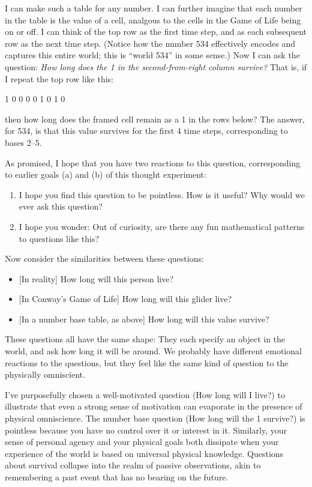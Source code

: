 \documentclass[9pt, twoside]{book}
\theoremstyle{argtstyle}
\begin{document}
I can make such a table for any number.
I can further imagine that each number in the table is the value of a cell,
analgous to the cells in the Game of Life being on or off.
I can think of the
top row as the first time step, and as each subsequent row as the next time
step.
(Notice how the number 534 effectively encodes and captures this entire
world; this is ``world 534'' in some sense.)
Now I can ask the question:
{\em How long does the 1 in the second-from-right column survive?}
That is, if I repeat the top row like this:
\begin{center}
    1 0 0 0 0 1 0 1  0
\end{center}
then how long does the framed cell
remain as a 1 in the rows below?
The answer, for 534, is that this value survives for the first 4
time steps, corresponding to bases 2--5.

As promised, I hope that you have two reactions to this question, corresponding
to earlier goals (a) and (b) of this thought experiment:
\begin{enumerate}
    \item I hope you find this question to be pointless. How is it useful?
        Why would we ever ask this question?
    \item I hope you wonder:
        Out of curiosity, are there any fun mathematical patterns to questions
        like this?
\end{enumerate}

Now consider the similarities between these questions:
\begin{itemize}
    \item{} [In reality] How long will this person live?
    \item{} [In Conway's Game of Life] How long will this glider live?
    \item{} [In a number base table, as above] How long will this value survive?
\end{itemize}
These questions all have the same shape: They each specify an
object in the world, and ask how long it will be around.
We probably have different emotional reactions to the questions, but they feel
like the same kind of question to the physically omniscient.

I've
purposefully chosen a well-motivated question (How long will I
live?) to illustrate that even a strong sense of motivation can evaporate
in the presence of physical omniscience.
The number base question (How long will the 1 survive?) is
pointless because you have no control over it or interest in it.
Similarly, your sense of personal agency
and your physical goals both dissipate when your experience of the world is
based
on universal physical knowledge. Questions about survival collapse into the
realm of passive observations, akin to remembering a past event that has no
bearing on the future.
\end{document}
